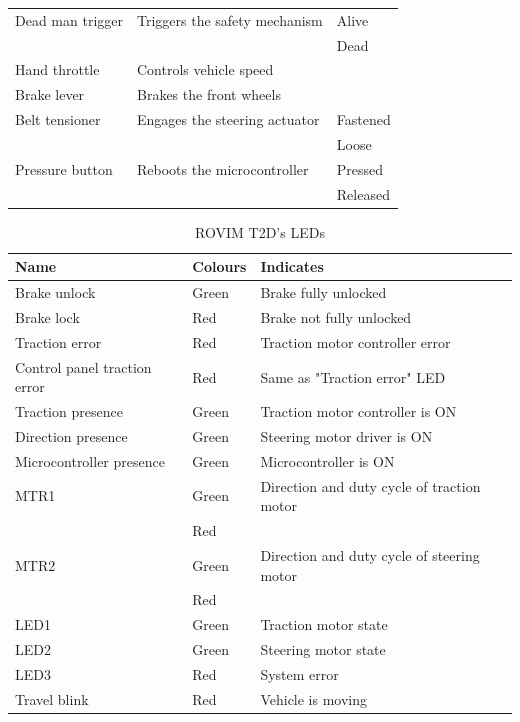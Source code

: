 \documentclass[journal]{IEEEtran}
\begin{document}
\begin{table}[!t]
\begin{tabular} {@{} m{} m{} m{} @{}}
        Dead man trigger & Triggers the safety mechanism & Alive\\&&Dead\\
        Hand throttle & Controls vehicle speed \footnotemark[1]& \\
        Brake lever & Brakes the front wheels &\\
        Belt tensioner & Engages the steering actuator & Fastened\\&&Loose\\ 
        Pressure button & Reboots the microcontroller & Pressed\\&&Released\\
        \hline
    \end{tabular}%
\end{table}


\begin{table}[!t]
    \renewcommand{\arraystretch}{1.3}
    \caption{ROVIM T2D's LEDs}
    \label{tab:leds}
    \centering
    \begin{tabular} {@{} m{} m{} m{} @{}}
        \hline%
        Name & Colours & Indicates\\
        \hline%
        Brake unlock & Green & Brake fully unlocked \footnotemark[2]\\
        Brake lock & Red & Brake not fully unlocked\\
        Traction error & Red & Traction motor controller error \\
        Control panel traction error & Red & Same as "Traction error" \ac{LED}\\
        Traction presence & Green & Traction motor controller is ON\\
        Direction presence & Green & Steering motor driver is ON\\
        Microcontroller presence & Green & Microcontroller is ON\\
        MTR1 & Green & Direction and duty cycle of traction motor \footnotemark[3]\\
             & Red\\
        MTR2 & Green & Direction and duty cycle of steering motor \footnotemark[3]\\
             & Red\\
        LED1 & Green & Traction motor state \footnotemark[3]\\
        LED2 & Green & Steering motor state \footnotemark[3]\\
        LED3 & Red & System error\\
        Travel blink & Red & Vehicle is moving\\
        \hline
    \end{tabular}
\end{table}
\end{document}
